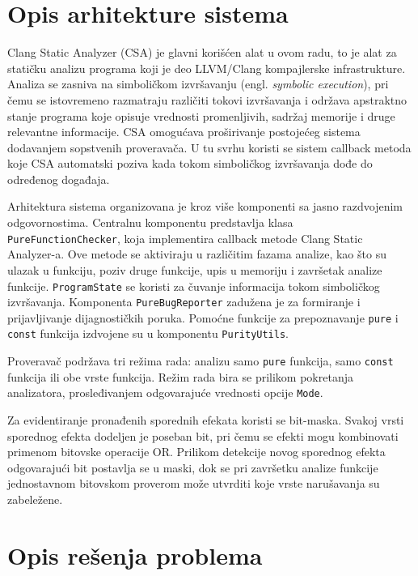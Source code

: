 \documentclass[a4paper,12pt]{article}
\begin{document}
\section{Opis arhitekture sistema}

Clang Static Analyzer (CSA) je glavni korišćen alat u ovom radu, to je alat za statičku analizu programa koji je deo LLVM/Clang kompajlerske infrastrukture. 
Analiza se zasniva na simboličkom izvršavanju (engl. \emph{symbolic execution}), 
pri čemu se istovremeno razmatraju različiti tokovi izvršavanja i održava apstraktno stanje programa koje opisuje vrednosti promenljivih, sadržaj memorije i druge relevantne informacije. 
CSA omogućava proširivanje postojećeg sistema dodavanjem sopstvenih proveravača. 
U tu svrhu koristi se sistem callback metoda koje CSA automatski poziva kada tokom simboličkog izvršavanja dođe do određenog događaja.


Arhitektura sistema organizovana je kroz više komponenti sa jasno razdvojenim odgovornostima. Centralnu komponentu predstavlja klasa \\
\texttt{PureFunctionChecker}, koja implementira callback metode Clang Static \\
Analyzer-a. Ove metode se aktiviraju u različitim fazama analize, kao što su ulazak u funkciju, poziv druge funkcije, upis u memoriju i završetak analize funkcije.
\texttt{ProgramState} se koristi za čuvanje informacija tokom simboličkog izvršavanja. 
Komponenta \texttt{PureBugReporter} zadužena je za formiranje i prijavljivanje dijagnostičkih poruka.
Pomoćne funkcije za prepoznavanje \texttt{pure} i \texttt{const} funkcija izdvojene su u komponentu \texttt{PurityUtils}.

Proveravač podržava tri režima rada: analizu samo \texttt{pure} funkcija, samo \texttt{const} funkcija ili obe vrste funkcija. Režim rada bira se prilikom pokretanja analizatora, prosleđivanjem odgovarajuće vrednosti opcije \texttt{Mode}.

Za evidentiranje pronađenih sporednih efekata koristi se bit-maska. Svakoj vrsti sporednog efekta dodeljen je poseban bit, pri čemu se efekti mogu kombinovati primenom bitovske operacije OR.
Prilikom detekcije novog sporednog efekta odgovarajući bit postavlja se u maski, dok se pri završetku analize funkcije jednostavnom bitovskom proverom može utvrditi koje vrste narušavanja su zabeležene.

\section{Opis rešenja problema}
\end{document}

